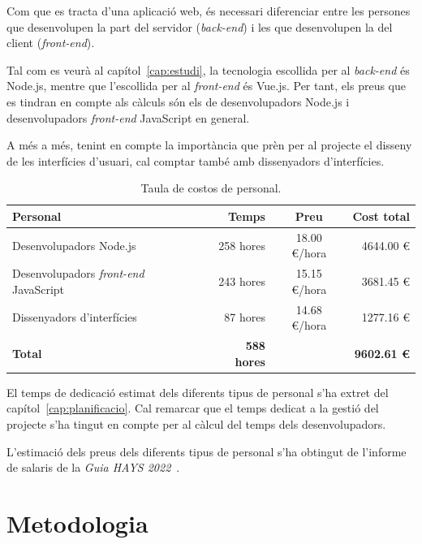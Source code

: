 \documentclass[a4paper,12pt]{ThesisStyle}
\begin{document}
Com que es tracta d'una aplicació web, és necessari diferenciar entre les persones que desenvolupen la part del servidor (\textit{back-end}) i les que desenvolupen la del client (\textit{front-end}).

Tal com es veurà al capítol~\ref{cap:estudi}, la tecnologia escollida per al \textit{back-end} és Node.js, mentre que l'escollida per al \textit{front-end} és Vue.js. Per tant, els preus que es tindran en compte als càlculs són els de desenvolupadors Node.js i desenvolupadors \textit{front-end} JavaScript en general.

A més a més, tenint en compte la importància que prèn per al projecte el disseny de les interfícies d'usuari, cal comptar també amb dissenyadors d'interfícies.

\begin{table}[H]
  \begin{tabularx}{\textwidth}{X  r  c  r}
    \toprule
    \rowcolor{TblDef}
    \textbf{Personal}                               & \textbf{Temps}      & \textbf{Preu}   & \textbf{Cost total}\\
    \midrule[0.9pt]
    Desenvolupadors Node.js                         & 258 hores           & 18.00 €/hora    & 4644.00 € \\
    \midrule
    Desenvolupadors \textit{front-end} JavaScript   & 243 hores           & 15.15 €/hora    & 3681.45 € \\
    \midrule
    Dissenyadors d'interfícies                      & 87 hores            & 14.68 €/hora    & 1277.16 € \\
    \midrule[0.9pt]
    \textbf{Total}                                  & \textbf{588 hores}  &                 & \textbf{9602.61 €} \\
    \bottomrule
  \end{tabularx}
  \caption{\label{taula:costos_personal} Taula de costos de personal.}
\end{table}

El temps de dedicació estimat dels diferents tipus de personal s'ha extret del capítol~\ref{cap:planificacio}. Cal remarcar que el temps dedicat a la gestió del projecte s'ha tingut en compte per al càlcul del temps dels desenvolupadors.

L'estimació dels preus dels diferents tipus de personal s'ha obtingut de l'informe de salaris de la \emph{Guia HAYS 2022}~\cite{Hays}.

\chapter{Metodologia}
\label{cap:metodologia}
\end{document}
